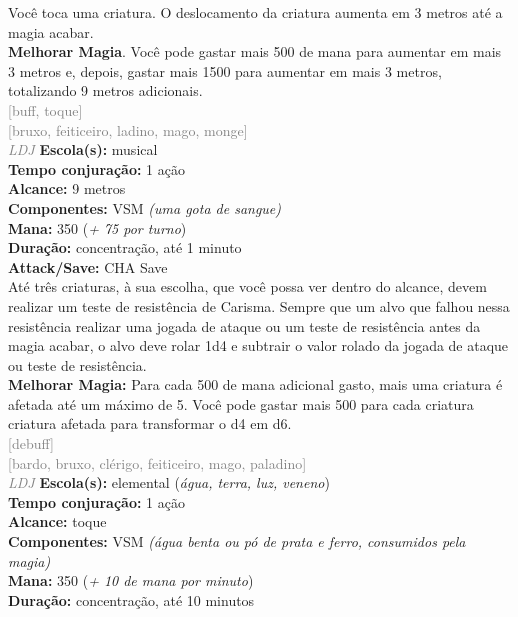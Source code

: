 \documentclass{RPG_Adventure}[2021/10/20]
\begin{document}
{\normalsize Você toca uma criatura. O deslocamento da criatura aumenta em 3 metros até a magia acabar.\\\t \textbf{Melhorar Magia}. Você pode gastar mais 500 de mana para aumentar em mais 3 metros e, depois, gastar mais 1500 para aumentar em mais 3 metros, totalizando 9 metros adicionais.\\}
{\scriptsize \textcolor{gray}{[buff, toque]\\}}
{\scriptsize \textcolor{gray}{[bruxo, feiticeiro, ladino, mago, monge]\\}}
{\tiny \textcolor{gray}{\textit{LDJ}}}
{\small \t \textbf{Escola(s):} musical\\\t \textbf{Tempo conjuração:} 1 ação\\\t \textbf{Alcance:} 9 metros\\\t \textbf{Componentes:} VSM \textit{(uma gota de sangue)}\\\t \textbf{Mana:} 350 (\textit{+ 75 por turno})\\\t \textbf{Duração:} concentração, até 1 minuto\\\t \textbf{Attack/Save:} CHA Save\\}
{\normalsize Até três criaturas, à sua escolha, que você possa ver dentro do alcance, devem realizar um teste de resistência de Carisma. Sempre que um alvo que falhou nessa resistência realizar uma jogada de ataque ou um teste de resistência antes da magia acabar, o alvo deve rolar 1d4 e subtrair o valor rolado da jogada de ataque ou teste de resistência.\\\t \textbf{Melhorar Magia:} Para cada 500 de mana adicional gasto, mais uma criatura é afetada até um máximo de 5. Você pode gastar mais 500 para cada criatura criatura afetada para transformar o d4 em d6.\\}
{\scriptsize \textcolor{gray}{[debuff]\\}}
{\scriptsize \textcolor{gray}{[bardo, bruxo, clérigo, feiticeiro, mago, paladino]\\}}
{\tiny \textcolor{gray}{\textit{LDJ}}}
{\small \t \textbf{Escola(s):} elemental (\textit{água, terra, luz, veneno})\\\t \textbf{Tempo conjuração:} 1 ação\\\t \textbf{Alcance:} toque\\\t \textbf{Componentes:} VSM \textit{(água benta ou pó de prata e ferro, consumidos pela magia)}\\\t \textbf{Mana:} 350 (\textit{+ 10 de mana por minuto})\\\t \textbf{Duração:} concentração, até 10 minutos\\}
\end{document}
